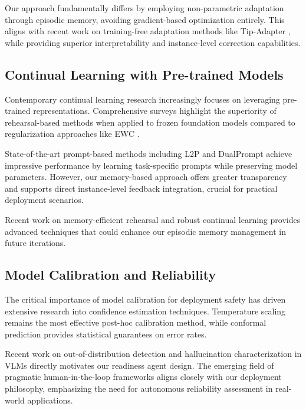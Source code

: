 \documentclass[conference]{IEEEtran}
\begin{document}
Our approach fundamentally differs by employing non-parametric adaptation through episodic memory, avoiding gradient-based optimization entirely. This aligns with recent work on training-free adaptation methods like Tip-Adapter \cite{zhang2021tip}, while providing superior interpretability and instance-level correction capabilities.

\subsection{Continual Learning with Pre-trained Models}

Contemporary continual learning research increasingly focuses on leveraging pre-trained representations. Comprehensive surveys \cite{hayes2024comprehensive, wang2024continual} highlight the superiority of rehearsal-based methods when applied to frozen foundation models compared to regularization approaches like EWC \cite{kirkpatrick2017overcoming}.

State-of-the-art prompt-based methods including L2P \cite{wang2022learning} and DualPrompt \cite{wang2022dualprompt} achieve impressive performance by learning task-specific prompts while preserving model parameters. However, our memory-based approach offers greater transparency and supports direct instance-level feedback integration, crucial for practical deployment scenarios.

Recent work on memory-efficient rehearsal \cite{lomonaco2024dejavu} and robust continual learning \cite{smith2024cops} provides advanced techniques that could enhance our episodic memory management in future iterations.

\subsection{Model Calibration and Reliability}

The critical importance of model calibration for deployment safety has driven extensive research into confidence estimation techniques. Temperature scaling \cite{guo2017calibration} remains the most effective post-hoc calibration method, while conformal prediction \cite{angelopoulos2021gentle, chen2024conformal} provides statistical guarantees on error rates.

Recent work on out-of-distribution detection \cite{liu2024navigating} and hallucination characterization in VLMs \cite{zhang2024self} directly motivates our readiness agent design. The emerging field of pragmatic human-in-the-loop frameworks \cite{zhang2024pragmatic} aligns closely with our deployment philosophy, emphasizing the need for autonomous reliability assessment in real-world applications.
\end{document}
